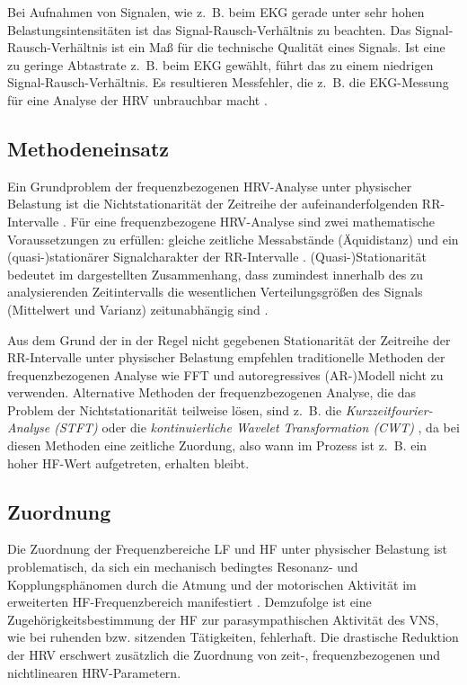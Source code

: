 Bei Aufnahmen von Signalen, wie z.~B. beim \ac{EKG} gerade unter sehr hohen Belastungsintensitäten ist das Signal-Rausch-Verhältnis zu beachten. Das Signal-Rausch-Verhältnis ist ein Maß für die technische Qualität eines Signals. Ist eine zu geringe Abtastrate z.~B. beim \ac{EKG} gewählt, führt das zu einem niedrigen Signal-Rausch-Verhältnis. Es resultieren Messfehler, die z.~B. die \ac{EKG}-Messung für eine Analyse der \ac{HRV} unbrauchbar macht \citep[][]{Hoos2010}.


\subsection{Methodeneinsatz} %
\label{sub:methodeneinsatz}

Ein Grundproblem der frequenzbezogenen \ac{HRV}-Analyse unter physischer Belastung ist die Nichtstationarität der Zeitreihe der aufeinanderfolgenden RR-Intervalle \citep[][]{Hottenrott2006}. Für eine frequenzbezogene \ac{HRV}-Analyse sind zwei mathematische Voraussetzungen zu erfüllen: gleiche zeitliche Messabstände (Äquidistanz) und ein (quasi-)stationärer Signalcharakter der RR-Intervalle \citep[][]{Hoos2006}. (Quasi-)Stationarität bedeutet im dargestellten Zusammenhang, dass zumindest innerhalb des zu analysierenden Zeitintervalls die wesentlichen Verteilungsgrößen des Signals (Mittelwert und Varianz) zeitunabhängig sind \citep[][]{Hoos2006}.

Aus dem Grund der in der Regel nicht gegebenen Stationarität der Zeitreihe der RR-Intervalle unter physischer Belastung empfehlen \citet[S.~113]{Sarmiento2013} traditionelle Methoden der frequenzbezogenen Analyse wie \acs{FFT} und autoregressives (AR-)Modell nicht zu verwenden. Alternative Methoden der frequenzbezogenen Analyse, die das Problem der Nichtstationarität teilweise lösen, sind z.~B. die \emph{Kurzzeitfourier-Analyse (STFT)} oder die \emph{kontinuierliche Wavelet Transformation (CWT)} \citep[][S.~61f.]{Hoos2010}, da bei diesen Methoden eine zeitliche Zuordung, also wann im Prozess ist z.~B. ein hoher \ac{HF}-Wert aufgetreten, erhalten bleibt. 


\subsection{Zuordnung} %
\label{sub:zuordnung}

Die Zuordnung der Frequenzbereiche \ac{LF} und \ac{HF} unter physischer Belastung ist problematisch, da sich ein mechanisch bedingtes Resonanz- und Kopplungsphänomen durch die Atmung und der motorischen Aktivität im erweiterten \ac{HF}-Frequenzbereich manifestiert \citep[][S.~62]{Hoos2010}. Demzufolge ist eine Zugehörigkeitsbestimmung der \ac{HF} zur parasympathischen Aktivität des \ac{VNS}, wie bei ruhenden bzw. sitzenden Tätigkeiten, fehlerhaft. Die drastische Reduktion der \ac{HRV} erschwert zusätzlich die Zuordnung von zeit-, frequenzbezogenen und nichtlinearen \ac{HRV}-Parametern.

